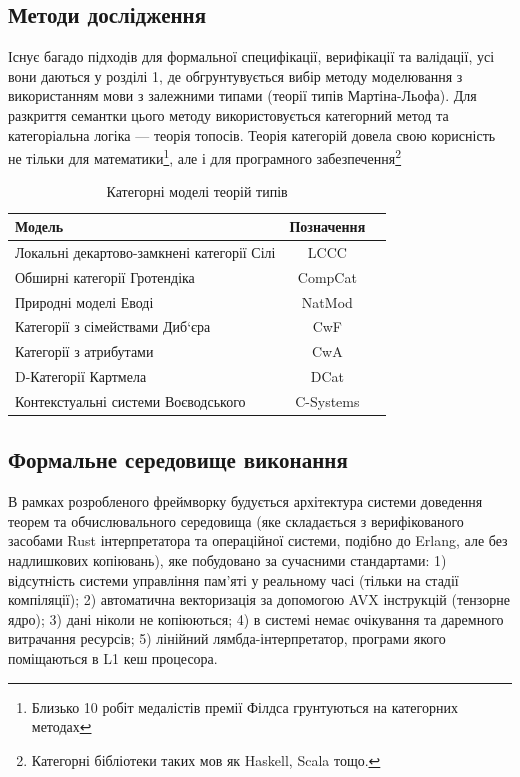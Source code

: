 \newpage
\subsection{Методи дослідження}
Існує багадо підходів для формальної специфікації,
верифікації та валідації, усі вони даються у розділі 1, де
обгрунтувується вибір методу моделювання з використанням
мови з залежними типами (теорії типів Мартіна-Льофа).
Для разкриття семантки цього методу використовується
категорний метод та категоріальна логіка --- теорія топосів.
Теорія категорій довела свою корисність не тільки для
математики\footnote{Близько 10 робіт медалістів премії
Філдса грунтуються на категорних методах},
але і для програмного
забезпечення\footnote{Категорні бібліотеки таких мов як Haskell, Scala тощо.}

\begin{table}[ht]
 \caption{Категорні моделі теорій типів}
  \begin{tabular}{lcc}
    \hline
\rowcolor{ZimaBlue}
 \textbf{Модель} & \textbf{Позначення} & \\
    \hline
 Локальні декартово-замкнені категорії Сілі & LCCC & \\
 Обширні категорії Гротендіка               & CompCat & \\
 Природні моделі Еводі                      & NatMod & \\
 Категорії з сімействами Диб`єра            & CwF & \\
 Категорії з атрибутами                     & CwA & \\
 D-Категорії Картмела                       & DCat & \\
 Контекстуальні системи Воєводського        & C-Systems & \\
    \hline
  \end{tabular}
\end{table}

\subsection{Формальне середовище виконання}
В рамках розробленого фреймворку будується
архітектура системи доведення теорем та обчислювального
середовища (яке складається з верифікованого засобами Rust
інтерпретатора та операційної системи, подібно до Erlang, але без надлишкових копіювань),
яке побудовано за сучасними стандартами:
1) відсутність системи управління пам'яті у реальному часі (тільки на стадії компіляції);
2) автоматична векторизація за допомогою AVX інструкцій (тензорне ядро);
3) дані ніколи не копіюються;
4) в системі немає очікування та даремного витрачання ресурсів;
5) лінійний лямбда-інтерпретатор, програми якого поміщаються в L1 кеш процесора.

